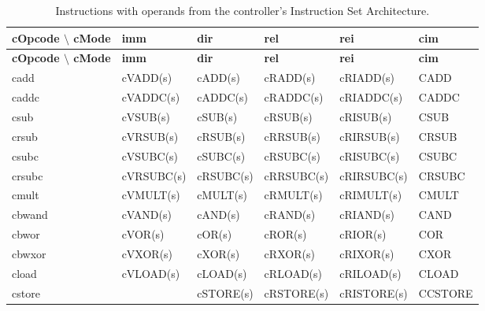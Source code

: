 {\small
{\centering
\begin{longtable}{|l||l|l|l|l|l|}
\caption{Instructions with operands from the controller's Instruction Set Architecture.}
\label{tab:controller_isa} \\
\hline
\textbf{cOpcode $\setminus$ cMode} & \textbf{imm} & \textbf{dir} & \textbf{rel} & \textbf{rei} & \textbf{cim} \\
\hline
\endfirsthead
\hline
\textbf{cOpcode $\setminus$ cMode} & \textbf{imm} & \textbf{dir} & \textbf{rel} & \textbf{rei} & \textbf{cim} \\
\hline
\endhead
\hline
\endfoot
\hline
\endlastfoot
cadd      & cVADD(s)    & cADD(s)    & cRADD(s)    & cRIADD(s)    & CADD       \\ \hline
caddc     & cVADDC(s)   & cADDC(s)   & cRADDC(s)   & cRIADDC(s)   & CADDC      \\ \hline
csub      & cVSUB(s)    & cSUB(s)    & cRSUB(s)    & cRISUB(s)    & CSUB       \\ \hline
crsub     & cVRSUB(s)   & cRSUB(s)   & cRRSUB(s)   & cRIRSUB(s)   & CRSUB      \\ \hline
csubc     & cVSUBC(s)   & cSUBC(s)   & cRSUBC(s)   & cRISUBC(s)   & CSUBC      \\ \hline
crsubc    & cVRSUBC(s)  & cRSUBC(s)  & cRRSUBC(s)  & cRIRSUBC(s)  & CRSUBC     \\ \hline
cmult     & cVMULT(s)   & cMULT(s)   & cRMULT(s)   & cRIMULT(s)   & CMULT      \\ \hline
cbwand    & cVAND(s)    & cAND(s)    & cRAND(s)    & cRIAND(s)    & CAND       \\ \hline
cbwor     & cVOR(s)     & cOR(s)     & cROR(s)     & cRIOR(s)     & COR        \\ \hline
cbwxor    & cVXOR(s)    & cXOR(s)    & cRXOR(s)    & cRIXOR(s)    & CXOR       \\ \hline
cload     & cVLOAD(s)   & cLOAD(s)   & cRLOAD(s)   & cRILOAD(s)   & CLOAD      \\ \hline
cstore    &             & cSTORE(s)  & cRSTORE(s)  & cRISTORE(s)  & CCSTORE    \\ \hline
\end{longtable}
}}




